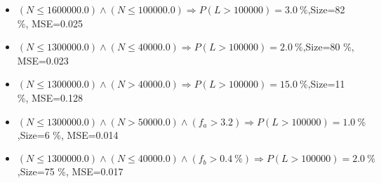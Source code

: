 \documentclass[numbered]{CSL}
\begin{document}
\begin{itemize}
\item $(N \leq 1600000.0) \land (N \leq 100000.0) \Rightarrow P(L > 100 000) = 3.0~\%$,\hfill Size=82 \%, MSE=0.025
\item $(N \leq 1300000.0) \land (N \leq 40000.0) \Rightarrow P(L > 100 000) = 2.0~\%$,\hfill Size=80 \%, MSE=0.023
\item $(N \leq 1300000.0) \land (N > 40000.0) \Rightarrow P(L > 100 000) = 15.0~\%$,\hfill Size=11 \%, MSE=0.128
\item $(N \leq 1300000.0) \land (N > 50000.0) \land (f_a > 3.2) \Rightarrow P(L > 100 000) = 1.0~\%$,\hfill Size=6 \%, MSE=0.014
\item $(N \leq 1300000.0) \land (N \leq 40000.0) \land (f_b > 0.4~\%) \Rightarrow P(L > 100 000) = 2.0~\%$,\hfill Size=75 \%, MSE=0.017
\end{itemize}
\end{document}
